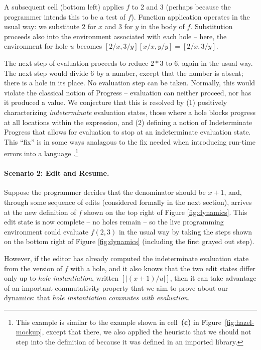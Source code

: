 A subsequent cell (bottom left) applies $f$ to $2$ and $3$ (perhaps because the programmer intends this to be a test of $f$). Function application operates in the usual way: 
we substitute $2$ for $x$ and $3$ for $y$ in the body of $f$. Substitution proceeds also into the environment associated with each hole -- here, the environment for hole $u$ becomes $[2/x, 3/y][x/x, y/y] = [2/x, 3/y]$.

The next step of evaluation proceeds to reduce $2 * 3$ to $6$, again in the usual way.
%
The next step would divide $6$ by a number, except that the number is
absent; there is a hole in its place. No evaluation step can be taken. 
%
Normally, this would violate the classical notion of Progress -- 
evaluation can neither proceed, nor has it produced a value. We conjecture that this is
resolved by (1) positively characterizing \emph{indeterminate} 
evaluation states, those where a hole blocks progress at all locations
within the expression, and (2) defining
a notion of Indeterminate Progress that allows for evaluation to stop at an 
indeterminate evaluation state. This ``fix'' is in some ways analagous to the fix needed when introducing 
run-time errors into a language \cite{pfpl}.\footnote{%
This example is similar to the example shown in cell~\textbf{(c)} in
Figure~\ref{fig:hazel-mockup}, except that there, we also applied
the heuristic that we should not step
into the definition of  because it was defined in an imported library.}

\paragraph{Scenario 2: Edit and Resume.}
Suppose the programmer decides that the denominator should
be $x+1$, and, through some sequence of edits (considered formally in the next section), arrives at 
the new definition of $f$ shown on the top right of Figure \ref{fig:dynamics}. This edit state is now complete -- no holes remain -- so the live programming environment 
could evaluate $f(2, 3)$ in the usual way by taking the steps shown on
the bottom right of Figure \ref{fig:dynamics} (including the first
grayed out step).

However, if the editor has already computed the indeterminate evaluation 
state from the version of $f$ with a hole, and it also knows that the 
two edit states differ only up to \emph{hole instantiation}, written 
$[\!| (x+1) / u
|\!]$, then it can take advantage of an important commutativity property that we aim 
to prove about our dynamics: that 
\emph{hole instantiation commutes with evaluation}. 

